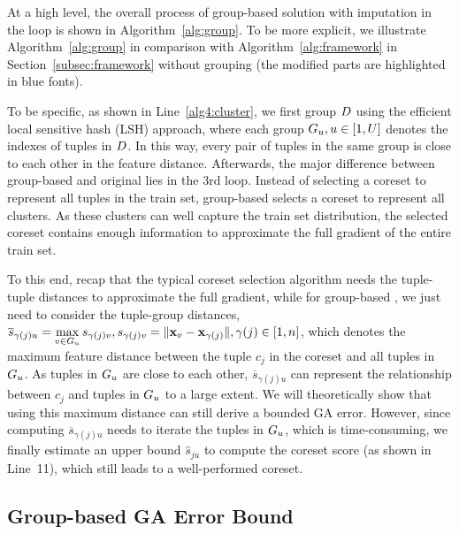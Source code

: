 At a high level, the overall process of group-based \ours solution with imputation in the loop is shown in Algorithm~\ref{alg:group}. To be more explicit, we illustrate Algorithm~\ref{alg:group} in comparison with Algorithm~\ref{alg:framework} in Section~\ref{subsec:framework} without grouping (the modified parts are highlighted in blue fonts).

To be specific, as shown in Line~\ref{alg4:cluster}, we first group $D$   using the efficient local sensitive hash (LSH) approach, where each group $G_u, u\in[1, U]$ denotes the indexes of tuples in $D$. In this way, every pair of tuples in the same group is close to each other in the feature distance.
%
 Afterwards, the major difference between group-based \ours and original \ours lies in the 3rd loop. Instead of  selecting a coreset to represent all tuples in the train set, group-based \ours selects a coreset to represent all clusters. As these clusters can well capture the train set distribution, the selected coreset contains enough information to approximate the full gradient of the entire train set. 
 
 To this end, recap that the typical coreset selection algorithm needs the tuple-tuple distances to approximate the full gradient, while for group-based \ours, we just need to consider the tuple-group distances, \ie  
$\overline{s}_{\gamma(j)u} = \max\limits_{v \in G_u} s_{\gamma(j)v}, s_{\gamma(j)v} = \lVert\mathbf{x}_v - \mathbf{x}_{\gamma(j)}\rVert, \gamma(j)\in[1, n]$, which denotes the maximum feature distance between the tuple $c_j$ in the coreset and all tuples in $G_u$. As tuples in $G_u$ are close to each other, $\overline{s}_{\gamma(j)u}$ can represent the relationship between $c_j$ and tuples in $G_u$ to a large extent.
%
We will theoretically show that using this maximum distance can still derive a bounded GA error. 
However, since computing $\overline{s}_{\gamma(j)u}$ needs to iterate the tuples in $G_u$, which is time-consuming, we finally estimate an upper bound $\hat{s}_{ju}$ to compute the coreset score (as shown in Line~11), which still leads to a well-performed coreset. 
%






\subsection{Group-based GA Error Bound}
\label{group-ea}

